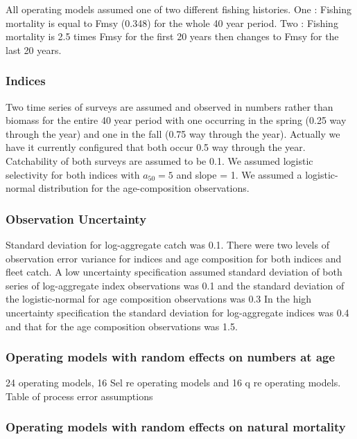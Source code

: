 \documentclass[
  12pt,
]{article}
\begin{document}
All operating models assumed one of two different fishing histories. One
: Fishing mortality is equal to Fmsy (0.348) for the whole 40 year
period. Two : Fishing mortality is 2.5 times Fmsy for the first 20 years
then changes to Fmsy for the last 20 years.

\hypertarget{indices}{%
\subsubsection{Indices}\label{indices}}

Two time series of surveys are assumed and observed in numbers rather
than biomass for the entire 40 year period with one occurring in the
spring (0.25 way through the year) and one in the fall (0.75 way through
the year). Actually we have it currently configured that both occur 0.5
way through the year. Catchability of both surveys are assumed to be
0.1. We assumed logistic selectivity for both indices with
\(a_{50} = 5\) and slope = 1. We assumed a logistic-normal distribution
for the age-composition observations.

\hypertarget{observation-uncertainty}{%
\subsubsection{Observation Uncertainty}\label{observation-uncertainty}}

Standard deviation for log-aggregate catch was 0.1. There were two
levels of observation error variance for indices and age composition for
both indices and fleet catch. A low uncertainty specification assumed
standard deviation of both series of log-aggregate index observations
was 0.1 and the standard deviation of the logistic-normal for age
composition observations was 0.3 In the high uncertainty specification
the standard deviation for log-aggregate indices was 0.4 and that for
the age composition observations was 1.5.

\hypertarget{operating-models-with-random-effects-on-numbers-at-age}{%
\subsubsection{Operating models with random effects on numbers at
age}\label{operating-models-with-random-effects-on-numbers-at-age}}

24 operating models, 16 Sel re operating models and 16 q re operating
models. Table of process error assumptions

\hypertarget{operating-models-with-random-effects-on-natural-mortality}{%
\subsubsection{Operating models with random effects on natural
mortality}\label{operating-models-with-random-effects-on-natural-mortality}}
\end{document}
